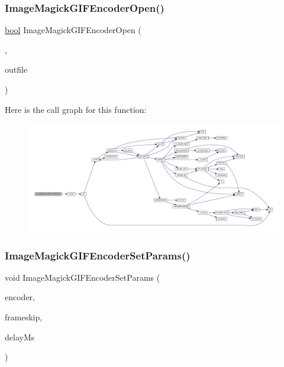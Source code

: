 \subsubsection{\texorpdfstring{Image\+Magick\+G\+I\+F\+Encoder\+Open()}{ImageMagickGIFEncoderOpen()}}
{\footnotesize\ttfamily \mbox{\hyperlink{libretro_8h_a4a26dcae73fb7e1528214a068aca317e}{bool}} Image\+Magick\+G\+I\+F\+Encoder\+Open (\begin{DoxyParamCaption}\item[{struct \mbox{\hyperlink{imagemagick-gif-encoder_8h_struct_image_magick_g_i_f_encoder}{Image\+Magick\+G\+I\+F\+Encoder}} $\ast$}]{,  }\item[{const char $\ast$}]{outfile }\end{DoxyParamCaption})}

Here is the call graph for this function\+:
\nopagebreak
\begin{figure}[H]
\begin{center}
\leavevmode
\includegraphics[width=350pt]{imagemagick-gif-encoder_8h_aaf05fdd1e4979c7a1fe1894cecf81f11_cgraph}
\end{center}
\end{figure}
\mbox{\label{imagemagick-gif-encoder_8h_a40b53230d8a8b3b36048085d06d9d029}} 
\subsubsection{\texorpdfstring{Image\+Magick\+G\+I\+F\+Encoder\+Set\+Params()}{ImageMagickGIFEncoderSetParams()}}
{\footnotesize\ttfamily void Image\+Magick\+G\+I\+F\+Encoder\+Set\+Params (\begin{DoxyParamCaption}\item[{struct \mbox{\hyperlink{imagemagick-gif-encoder_8h_struct_image_magick_g_i_f_encoder}{Image\+Magick\+G\+I\+F\+Encoder}} $\ast$}]{encoder,  }\item[{\mbox{\hyperlink{ioapi_8h_a787fa3cf048117ba7123753c1e74fcd6}{int}}}]{frameskip,  }\item[{\mbox{\hyperlink{ioapi_8h_a787fa3cf048117ba7123753c1e74fcd6}{int}}}]{delay\+Ms }\end{DoxyParamCaption})}

